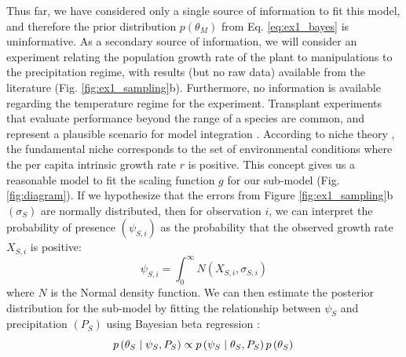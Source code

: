 \documentclass[11pt]{article}
\begin{document}
Thus far, we have considered only a single source of information to fit this model, and therefore the prior distribution \(p\left(\theta_M \right)\) from Eq. \ref{eq:ex1_bayes} is uninformative.
As a secondary source of information, we will consider an experiment relating the population growth rate of the plant to manipulations to the precipitation regime, with results (but no raw data) available from the literature (Fig. \ref{fig:ex1_sampling}b). 
Furthermore, no information is available regarding the temperature regime for the experiment.
Transplant experiments that evaluate performance beyond the range of a species are common, and represent a plausible scenario for model integration \citep{Hargreaves2014}.
According to niche theory \citep{Holt2009}, the fundamental niche corresponds to the set of environmental conditions where the per capita intrinsic growth rate $r$ is positive.
This concept gives us a reasonable model to fit the scaling function $g$ for our sub-model (Fig. \ref{fig:diagram}).
If we hypothesize that the errors from Figure \ref{fig:ex1_sampling}b \( \left(\sigma_{S} \right) \) are normally distributed, then for observation $i$, we can interpret the probability of presence \( \left(\psi_{S,i}\right)\) as the probability that the observed growth rate \(X_{S,i}\) is positive:
\begin{equation}
	\psi_{S,i} = \int_0^\infty N \left(X_{S,i}, \sigma_{S,i} \right)
\end{equation}
where \(N\) is the Normal density function.
We can then estimate the posterior distribution for the sub-model by fitting the relationship between \(\psi_S\) and precipitation \( \left( P_S \right) \) using Bayesian beta regression \citep{Ferrari2004}:
\begin{equation}
\label{eq:ex1_thetas}
	p\left (\theta_S \mid \psi_S,P_S \right ) \propto 
	p \left(\psi_S \mid \theta_S, P_S \right)
	p \left(\theta_S \right) \\
\end{equation}
\end{document}
